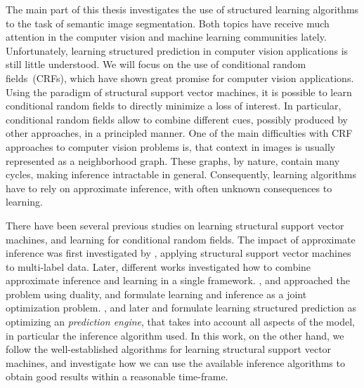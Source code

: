 The main part of this thesis investigates the use of structured learning
algorithms to the task of semantic image segmentation. Both topics have receive
much attention in the computer vision and machine learning communities lately.
Unfortunately, learning structured prediction in computer vision applications
is still little understood.
We will focus on the use of conditional random fields~(CRFs), which have shown
great promise for computer vision applications. Using the paradigm of
structural support vector machines, it is possible to learn conditional random
fields to directly minimize a loss of interest. In particular, conditional
random fields allow to combine different cues, possibly produced by other
approaches, in a principled manner. One of the main difficulties with CRF
approaches to computer vision problems is, that context in images is usually
represented as a neighborhood graph.  These graphs, by nature, contain many
cycles, making inference intractable in general. Consequently, learning algorithms
have to rely on approximate inference, with often unknown consequences to learning.

There have been several previous studies on learning structural support vector machines,
and learning for conditional random fields. The impact of approximate inference was first
investigated by \citet{finley2008training}, applying structural support vector machines
to multi-label data. Later, different works investigated how to combine approximate inference and
learning in a single framework. \citet{meshi2010learning, komodakis2011efficient}, and \citet{hazan2010primal} approached
the problem using duality, and formulate learning and inference as a joint optimization problem.
\citet{stoyanov2011empirical}, and later \citet{jancsarylearning} and  \citet{krahenbuhlparameter} formulate learning
structured prediction as optimizing an \emph{prediction engine}, that takes into account all aspects
of the model, in particular the inference algorithm used.
In this work, on the other hand, we follow the well-established algorithms for learning structural
support vector machines, and investigate how we can use the available inference algorithms to
obtain good results within a reasonable time-frame.

